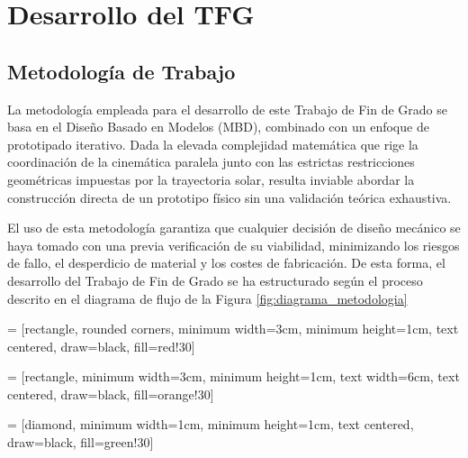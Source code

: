 \chapter{Desarrollo del TFG}
\label{ch:desarrollo}

\section{Metodología de Trabajo}
\label{sec:Metodologia}

La metodología empleada para el desarrollo de este Trabajo de Fin de Grado se basa en el Diseño Basado en Modelos (\gls{MBD}), combinado con un enfoque de prototipado iterativo. Dada la elevada complejidad matemática que rige la coordinación de la cinemática paralela junto con las estrictas restricciones geométricas impuestas por la trayectoria solar, resulta inviable abordar la construcción directa de un prototipo físico sin una validación teórica exhaustiva.

El uso de esta metodología garantiza que cualquier decisión de diseño mecánico se haya tomado con una previa verificación de su viabilidad, minimizando los riesgos de fallo, el desperdicio de material y los costes de fabricación. De esta forma, el desarrollo del Trabajo de Fin de Grado se ha estructurado según el proceso descrito en el diagrama de flujo de la Figura \ref{fig:diagrama_metodologia}

 = [rectangle, rounded corners, 
minimum width=3cm, 
minimum height=1cm,
text centered, 
draw=black, 
fill=red!30]

 = [rectangle,
minimum width=3cm, 
minimum height=1cm,
text width=6cm, 
text centered,
draw=black, 
fill=orange!30]

 = [diamond, 
minimum width=1cm, 
minimum height=1cm, 
text centered, 
draw=black, 
fill=green!30]

